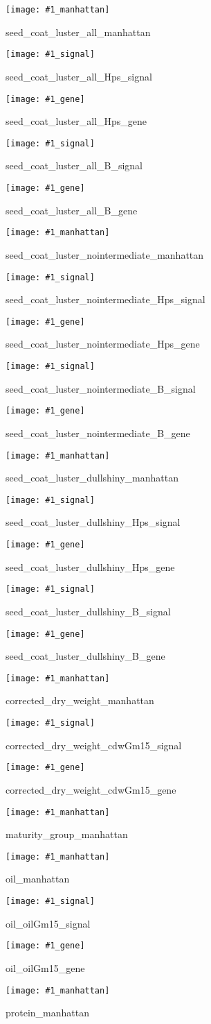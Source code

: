 \documentclass[12pt]{article}
\newenvironment{cfigure}
	{\begin{figure} \centering}
	{\end{figure}}
\newcommand{\manhattanplot}[1]{
\begin{cfigure}
	\texttt{[image: \#1\_manhattan]}
	\caption{#1\_manhattan}
	\label{#1_manhattan}
\end{cfigure}

\clearpage}
\newcommand{\signalplot}[1]{
\begin{cfigure}
	\texttt{[image: \#1\_signal]}
	\caption{#1\_signal}
	\label{#1_signal}
\end{cfigure}

\clearpage}
\newcommand{\geneplot}[1]{
\begin{cfigure}
	\texttt{[image: \#1\_gene]}
	\caption{#1\_gene}
	\label{#1_gene}
\end{cfigure}

\clearpage}
\begin{document}
\manhattanplot{seed_coat_luster_all}
\signalplot{seed_coat_luster_all_Hps}
\geneplot{seed_coat_luster_all_Hps}
\signalplot{seed_coat_luster_all_B}
\geneplot{seed_coat_luster_all_B}

\manhattanplot{seed_coat_luster_nointermediate}
\signalplot{seed_coat_luster_nointermediate_Hps}
\geneplot{seed_coat_luster_nointermediate_Hps}
\signalplot{seed_coat_luster_nointermediate_B}
\geneplot{seed_coat_luster_nointermediate_B}

\manhattanplot{seed_coat_luster_dullshiny}
\signalplot{seed_coat_luster_dullshiny_Hps}
\geneplot{seed_coat_luster_dullshiny_Hps}
\signalplot{seed_coat_luster_dullshiny_B}
\geneplot{seed_coat_luster_dullshiny_B}

\manhattanplot{corrected_dry_weight}
\signalplot{corrected_dry_weight_cdwGm15}
\geneplot{corrected_dry_weight_cdwGm15}


\manhattanplot{maturity_group}

\manhattanplot{oil}
\signalplot{oil_oilGm15}
\geneplot{oil_oilGm15}

\manhattanplot{protein}
\end{document}

